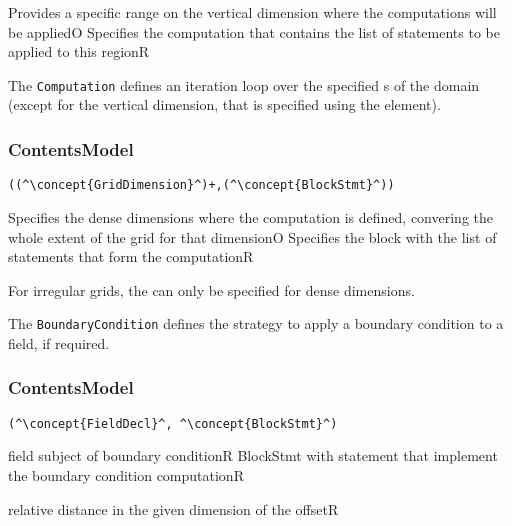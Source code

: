 \begin{HIRChildElements}
	{Provides a specific range on the vertical dimension where
		the computations will be applied}{O}
	{Specifies the computation that contains the list of statements to be applied to this region}{R}
\end{HIRChildElements}

The {\tt Computation} defines an iteration loop over the specified s of the domain (except for the vertical dimension, 
that is specified using the  element).

\subsubsection*{ContentsModel}{}

\begin{lstlisting}[style=default,frame=none]
((^\concept{GridDimension}^)+,(^\concept{BlockStmt}^))
\end{lstlisting}

\begin{HIRChildElements}
	{Specifies the dense dimensions where the computation is defined,
		convering the whole extent of the grid for that dimension}{O}
	{Specifies the block with the list of statements that form the computation}{R}
\end{HIRChildElements}

For irregular grids, the  can only 
be specified for dense dimensions.

The {\tt BoundaryCondition} defines the strategy to apply a boundary condition to a field, if required.

\subsubsection*{ContentsModel}{}

\begin{lstlisting}[style=default,frame=none]
(^\concept{FieldDecl}^, ^\concept{BlockStmt}^)
\end{lstlisting}

\begin{HIRChildElements}
	{field subject of boundary condition}{R}
	{BlockStmt with statement that implement the boundary condition computation}{R}
\end{HIRChildElements}

\begin{HIRAttributes}
	{relative distance in the given dimension of the offset}{R}
\end{HIRAttributes}
